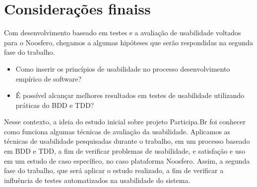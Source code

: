 \section{Considerações finaiss}
\label{sec:consideracoes-finais}

Com desenvolvimento baseado em testes e a avaliação de usabilidade voltados para o Noosfero, chegamos a algumas hipóteses que serão respondidas na segunda fase do trabalho.

\begin{itemize}
\item Como inserir os princípios de usabilidade no processo desenvolvimento empírico de software?
\item É possível alcançar melhores resultados em testes de usabilidade utilizando práticas do BDD e TDD?
\end{itemize}

Nesse contexto, a ideia do estudo inicial sobre projeto Participa.Br foi conhecer como funciona algumas técnicas de avaliação da usabilidade.
%
Aplicamos as técnicas de usabilidade pesquisadas durante o trabalho, em um processo baseado em BDD e TDD, a fim de verificar problemas de usabilidade, e satisfação e uso em um estudo de caso específico, no caso plataforma Noosfero. 
%
Assim, a segunda fase do trabalho, que será aplicar o estudo realizado, a fim de verificar a influência de testes automatizados na usabilidade do sistema. 
